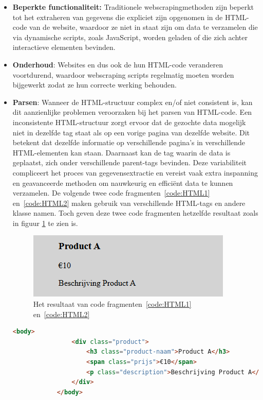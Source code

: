 \begin{itemize}
    \item \textbf{Beperkte functionaliteit: }Traditionele webscrapingmethoden zijn beperkt tot het extraheren van gegevens die expliciet zijn opgenomen in de HTML-code van de website, waardoor ze niet in staat zijn om data te verzamelen die via dynamische scripts, zoals JavaScript, worden geladen of die zich achter interactieve elementen bevinden.

    \item \textbf{Onderhoud}: Websites en dus ook de hun HTML-code veranderen voortdurend, waardoor webscraping scripts regelmatig moeten worden bijgewerkt zodat ze hun correcte werking behouden.

    \item \textbf{Parsen}: Wanneer de HTML-structuur complex en/of niet consistent is, kan dit aanzienlijke problemen veroorzaken bij het parsen van HTML-code. Een inconsistente HTML-structuur zorgt ervoor dat de gezochte data mogelijk niet in dezelfde tag staat als op een vorige pagina van dezelfde website. Dit betekent dat dezelfde informatie op verschillende pagina's in verschillende HTML-elementen kan staan. Daarnaast kan de tag waarin de data is geplaatst, zich onder verschillende parent-tags bevinden. Deze variabiliteit compliceert het proces van gegevensextractie en vereist vaak extra inspanning en geavanceerde methoden om nauwkeurig en efficiënt data te kunnen verzamelen.
    De volgende twee code fragmenten~\ref{code:HTML1}  en~\ref{code:HTML2} maken gebruik van verschillende HTML-tags en andere klasse namen. Toch geven deze twee code fragmenten hetzelfde resultaat zoals in figuur \ref{fig:inconsistente HTML}  te zien is.

    \begin{figure}[h]
        \centering
        \includegraphics{graphics/HTML-voorbeeld.png}
        \caption{Het resultaat van code fragmenten~\ref{code:HTML1} en~\ref{code:HTML2}}
        \label{fig:inconsistente HTML}
    \end{figure}

    \begin{listing}
        \begin{lstlisting}[language=HTML, caption={HTML voorbeeld 1},label={code:HTML1}]
            <body>
                <div class="product">
                    <h3 class="product-naam">Product A</h3>
                    <span class="prijs">€10</span>
                    <p class="description">Beschrijving Product A</p>
                </div>
            </body>
        \end{lstlisting}


\end{listing}
\end{itemize}
